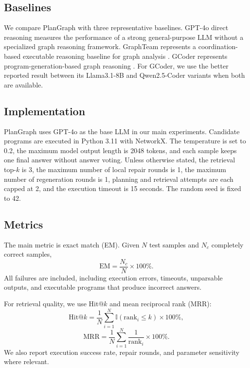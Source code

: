 \documentclass[pdflatex,sn-mathphys-num]{sn-jnl}
\theoremstyle{thmstyleone}
\theoremstyle{thmstyletwo}
\theoremstyle{thmstylethree}
\begin{document}
\subsection{Baselines}

We compare PlanGraph with three representative baselines. GPT-4o direct reasoning measures the performance of a strong general-purpose LLM without a specialized graph reasoning framework. GraphTeam represents a coordination-based executable reasoning baseline for graph analysis \cite{li2024graphteam}. GCoder represents program-generation-based graph reasoning \cite{zhang2025gcoder}. For GCoder, we use the better reported result between its Llama3.1-8B and Qwen2.5-Coder variants when both are available.

\subsection{Implementation}

PlanGraph uses GPT-4o as the base LLM in our main experiments. Candidate programs are executed in Python 3.11 with NetworkX. The temperature is set to 0.2, the maximum model output length is 2048 tokens, and each sample keeps one final answer without answer voting. Unless otherwise stated, the retrieval top-$k$ is 3, the maximum number of local repair rounds is 1, the maximum number of regeneration rounds is 1, planning and retrieval attempts are each capped at 2, and the execution timeout is 15 seconds. The random seed is fixed to 42.

\subsection{Metrics}

The main metric is exact match (EM). Given $N$ test samples and $N_c$ completely correct samples,
\begin{equation}
\mathrm{EM}=\frac{N_c}{N}\times 100\%.
\end{equation}
All failures are included, including execution errors, timeouts, unparsable outputs, and executable programs that produce incorrect answers.

For retrieval quality, we use Hit@$k$ and mean reciprocal rank (MRR):
\begin{equation}
\mathrm{Hit@}k=\frac{1}{N}\sum_{i=1}^{N}\mathbb{I}(\mathrm{rank}_i \leq k)\times 100\%,
\end{equation}
\begin{equation}
\mathrm{MRR}=\frac{1}{N}\sum_{i=1}^{N}\frac{1}{\mathrm{rank}_i}\times 100\%.
\end{equation}
We also report execution success rate, repair rounds, and parameter sensitivity where relevant.
\end{document}
